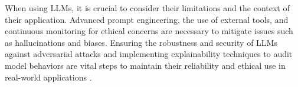 When using LLMs, it is crucial to consider their limitations and the context of their application. Advanced prompt engineering, the use of external tools, and continuous monitoring for ethical concerns are necessary to mitigate issues such as hallucinations and biases. Ensuring the robustness and security of LLMs against adversarial attacks and implementing explainability techniques to audit model behaviors are vital steps to maintain their reliability and ethical use in real-world applications \cite{liu2023explainability,zhao2023explainability,xu2024comprehensive}.
